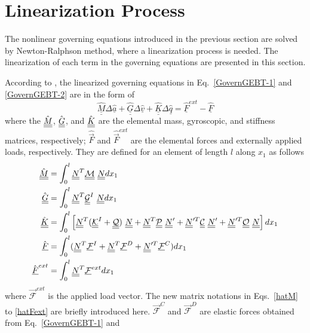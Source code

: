 \section{Linearization Process}
\label{sec:LinearProcess}
The nonlinear governing equations introduced in the previous section are solved by Newton-Ralphson method, where a linearization process is needed. The linearization of each term in the governing equations are presented in this section.

According to \cite{Bauchau:2010}, the linearized governing equations
in Eq.~\eqref{GovernGEBT-1} and \eqref{GovernGEBT-2} are in the form of
\begin{equation}
	\label{LinearizedEqn}
	\hat{\underline{\underline{M}}} \Delta \hat{\underline{a}} +\hat{\underline{\underline{G}}} \Delta \hat{\underline{v}}+ \hat{\underline{\underline{K}}} \Delta \hat{\underline{q}} = \hat{\underline{F}}^{ext} - \hat{\underline{F}}
\end{equation} 
where the $\hat{\underline{\underline{M}}}$, $\hat{\underline{\underline{G}}}$, and $\hat{\underline{\underline{K}}}$ are the
elemental mass, gyroscopic, and stiffness matrices, respectively;
$\hat{\vec{F}}$ and $\hat{\vec{F}}^{ext}$ are the elemental forces and
externally applied loads, respectively. They are defined for an element of length $l$ along $x_1$ as follows
\begin{align}
	\label{hatM} 
	\hat{\underline{\underline{M}}}&= \int_0^l \underline{\underline{N}}^T \mathcal{\underline{\underline{M}}} ~\underline{\underline{N}} dx_1 \\
	\label{hatG}
	\hat{\underline{\underline{G}}} &= \int_0^l \underline{\underline{N}}^T \underline{\underline{\mathcal{G}}}^I~\underline{\underline{N}} dx_1\\ 
	\label{hatK}
	\hat{\underline{\underline{K}}}&=\int_0^l \left[ \underline{\underline{N}}^T (\underline{\underline{\mathcal{K}}}^I + \mathcal{\underline{\underline{Q}}})~ \underline{\underline{N}} + \underline{\underline{N}}^T \mathcal{\underline{\underline{P}}}~ \underline{\underline{N}}^\prime + \underline{\underline{N}}^{\prime T} \mathcal{\underline{\underline{C}}}~ \underline{\underline{N}}^\prime + \underline{\underline{N}}^{\prime T} \mathcal{\underline{\underline{O}}}~ \underline{\underline{N}} \right] d x_1 \\	
	\label{hatF}
	\hat{\underline{F}} &= \int_0^l (\underline{\underline{N}}^T \underline{\mathcal{F}}^I + \underline{\underline{N}}^T \mathcal{\underline{F}}^D + \underline{\underline{N}}^{\prime T} \mathcal{\underline{F}}^C)dx_1 \\
	\label{hatFext}
	\hat{\underline{F}}^{ext}& = \int_0^l \underline{\underline{N}}^T \mathcal{\underline{F}}^{ext} dx_1 
\end{align}
where $\mathcal{\vec{F}}^{ext}$ is the applied load vector. The new matrix notations in Eqs.~\eqref{hatM} to \eqref{hatFext} are briefly
introduced here. $\mathcal{\vec{F}}^C$ and $\mathcal{\vec{F}}^D$ are
elastic forces obtained from Eq.~\eqref{GovernGEBT-1} and
